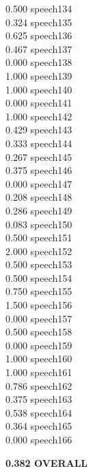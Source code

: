 \documentclass[10pt]{article}
\begin{document}
\begin{enumerate}
\begin{enumerate}
\begin{multicols}{5}
            0.500 speech134\\
            0.324 speech135\\
            0.625 speech136\\
            0.467 speech137\\
            0.000 speech138\\
            1.000 speech139\\
            1.000 speech140\\
            0.000 speech141\\
            1.000 speech142\\
            0.429 speech143\\
            0.333 speech144\\
            0.267 speech145\\
            0.375 speech146\\
            0.000 speech147\\
            0.208 speech148\\
            0.286 speech149\\
            0.083 speech150\\
            0.500 speech151\\
            2.000 speech152\\
            0.500 speech153\\
            0.500 speech154\\
            0.750 speech155\\
            1.500 speech156\\
            0.000 speech157\\               
            0.500 speech158\\
            0.000 speech159\\
            1.000 speech160\\
            1.000 speech161\\
            0.786 speech162\\
            0.375 speech163\\
            0.538 speech164\\
            0.364 speech165\\
            0.000 speech166\\       
            \end{multicols}
            \textbf{0.382 OVERALL}\\   
            

\end{enumerate}
\end{enumerate}
\end{document}
